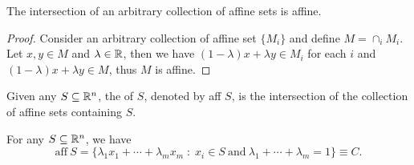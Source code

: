 \documentclass[11pt,a4paper]{article}
\begin{document}

\begin{lemma}\label{lem:intersection_affine_sets}
    The intersection of an arbitrary collection of affine sets is affine.
\end{lemma}

\begin{proof}
    Consider an arbitrary collection of affine set $\{M_i\}$ and define $M = \cap_i M_i$. Let $x,y\in M$ and $\lambda \in \mathbb{R}$, then we have $(1-\lambda)x + \lambda y\in M_i$ for each $i$ and $(1-\lambda)x + \lambda y\in M$, thus $M$ is affine.
\end{proof}

\begin{definition}
    Given any $S\subseteq \mathbb{R}^n$, the  of $S$, denoted by aff $S$, is the intersection of the collection of affine sets containing $S$.
\end{definition}

\begin{proposition}\label{prop:affine_hull_affine_comb}
    For any $S\subseteq \mathbb{R}^n$, we have 
    \begin{equation*}
        \text{aff}\ S = \{ \lambda_1 x_1 + \cdots + \lambda_m x_m \;:\; x_i\in S \ \text{and}\ \lambda_1+\cdots+\lambda_m = 1 \}\equiv C.
    \end{equation*}
\end{proposition}
\end{document}
